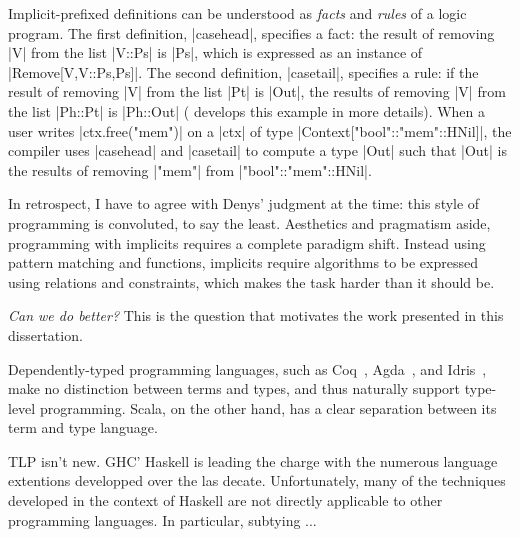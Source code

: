 \memImplicitRemove

\noindent
Implicit-prefixed definitions can be understood as \emph{facts} and \emph{rules} of a logic program.
The first definition, |casehead|, specifies a fact: the result of removing |V| from the list |V::Ps| is |Ps|, which is expressed as an instance of |Remove[V,V::Ps,Ps]|.
The second definition, |casetail|, specifies a rule: if the result of removing |V| from the list |Pt| is |Out|, the results of removing |V| from the list |Ph::Pt| is |Ph::Out| ( develops this example in more details).
When a user writes |ctx.free("mem")| on a |ctx| of type |Context["bool"::"mem"::HNil]|, the compiler uses |casehead| and |casetail| to compute a type |Out| such that |Out| is the results of removing |"mem"| from |"bool"::"mem"::HNil|.

In retrospect, I have to agree with Denys' judgment at the time: this style of programming is convoluted, to say the least.
Aesthetics and pragmatism aside, programming with implicits requires a complete paradigm shift.
Instead using pattern matching and functions, implicits require algorithms to be expressed using relations and constraints, which makes the task harder than it should be.

\emph{Can we do better?} This is the question that motivates the work presented in this dissertation.

Dependently-typed programming languages, such as Coq~\citep{bertot2004interactive}, Agda~\citep{norell2007towards}, and Idris~\citep{brady2014idris}, make no distinction between terms and types, and thus naturally support type-level programming.
Scala, on the other hand, has a clear separation between its term and type language.


TLP isn't new. GHC' Haskell is leading the charge with the numerous language extentions developped over the las decate. Unfortunately, many of the techniques developed in the context of Haskell are not directly applicable to other programming languages. In particular, subtying ...


\lipsum[1]


